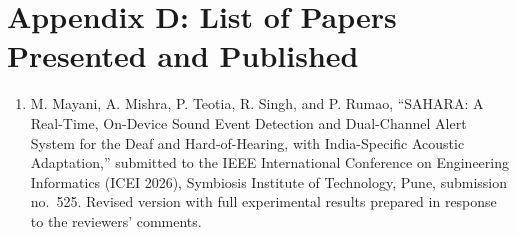 \documentclass[12pt,a4paper,oneside]{report}
\begin{document}
\clearpage
\chapter*{Appendix D: List of Papers Presented and Published}
\begin{enumerate}
\item M. Mayani, A. Mishra, P. Teotia, R. Singh, and P. Rumao, ``SAHARA: A Real-Time, On-Device Sound Event Detection and Dual-Channel Alert System for the Deaf and Hard-of-Hearing, with India-Specific Acoustic Adaptation,'' submitted to the IEEE International Conference on Engineering Informatics (ICEI 2026), Symbiosis Institute of Technology, Pune, submission no.\ 525. Revised version with full experimental results prepared in response to the reviewers' comments.
\end{enumerate}
\end{document}

